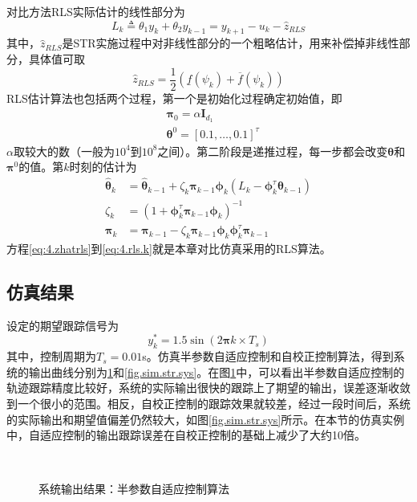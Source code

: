 对比方法RLS实际估计的线性部分为
\begin{equation}\label{eq:4.zrls}
L_{k}\triangleq\theta_{1}y_{k} + \theta_{2} y_{k-1}=y_{k+1}-u_{k}-\hat{z}_{RLS}
\end{equation}
其中，$\hat{z}_{RLS}$是STR实施过程中对非线性部分的一个粗略估计，用来补偿掉非线性部分，具体值可取
\begin{equation}\label{eq:4.zhatrls}
\hat{z}_{RLS}=\frac12 (\underline{f}(\psi_{k})+\overline{f}(\psi_{k})) 
\end{equation}
RLS估计算法也包括两个过程，第一个是初始化过程确定初始值，即
\begin{equation}\label{eq:4.rls.0}
\begin{split}
&\bm{\pi}_{0}=\alpha \bm{I}_{d_{1}}\\
&\bm{\theta}^{0}=[0.1,\dots,0.1]^{\tau}
\end{split}
\end{equation}
$\alpha$取较大的数（一般为$10^{4}$到$10^{8}$之间）。第二阶段是递推过程，每一步都会改变$\bm{\theta}$和$\bm{\pi}^{0}$的值。第$k$时刻的估计为
\begin{equation}\label{eq:4.rls.k}
\begin{split}
\hat{\bm{\theta}}_{k}&=\hat{\bm{\theta}}_{k-1}+ \zeta_{k} \bm{\pi}_{k-1} \bm{\phi}_{k} (L_{k}-\bm{\phi}_k^\tau \bm{\theta}_{k-1})\\
\zeta_k&=(1+\bm{\phi}_{k}^{\tau} \bm{\pi}_{k-1} \bm{\phi}_{k})^{-1}\\
\bm{\pi}_{k}&=\bm{\pi}_{k-1}-\zeta_k \bm{\pi}_{k-1} \bm{\phi}_{k} \bm{\phi}_{k}^{\tau} \bm{\pi}_{k-1}
\end{split}
\end{equation}
方程\eqref{eq:4.zhatrls}到\eqref{eq:4.rls.k}就是本章对比仿真采用的RLS算法。

\subsection{仿真结果}\label{sect:4.4.2}
设定的期望跟踪信号为
\begin{equation}\label{eq:4.sim.yd}
y_{k}^{*} = 1.5\sin(2\bm{\pi} k\times T_{s})
\end{equation}
其中，控制周期为$T_{s}=0.01$s。仿真半参数自适应控制和自校正控制算法，得到系统的输出曲线分别为\ref{fig.sim.elm.sys}和\ref{fig.sim.str.sys}。在图\ref{fig.sim.elm.sys}中，可以看出半参数自适应控制的轨迹跟踪精度比较好，系统的实际输出很快的跟踪上了期望的输出，误差逐渐收敛到一个很小的范围。相反，自校正控制的跟踪效果就较差，经过一段时间后，系统的实际输出和期望值偏差仍然较大，如图\ref{fig.sim.str.sys}所示。在本节的仿真实例中，自适应控制的输出跟踪误差在自校正控制的基础上减少了大约10倍。
\begin{figure}[!htb]
	\centering
	\\
	\caption{系统输出结果：半参数自适应控制算法}
	\label{fig.sim.elm.sys}
\end{figure}

